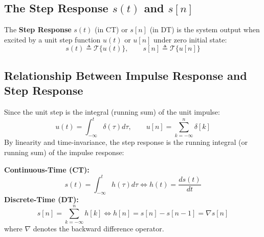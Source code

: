 \documentclass[12pt,a4paper]{article}
\begin{document}
\subsection{The Step Response $s(t)$ and $s[n]$}

\begin{tcolorbox}[defbox, title={\textbf{Definition: Step Response}}]
The \textbf{Step Response} $s(t)$ (in CT) or $s[n]$ (in DT) is the system output when excited by a unit step function $u(t)$ or $u[n]$ under zero initial state:
\begin{equation}
  s(t) \triangleq \mathcal{T}\{u(t)\}, \qquad s[n] \triangleq \mathcal{T}\{u[n]\}
\end{equation}
\end{tcolorbox}

\subsection{Relationship Between Impulse Response and Step Response}
Since the unit step is the integral (running sum) of the unit impulse:
\begin{equation}
  u(t) = \int_{-\infty}^t \delta(\tau) d\tau, \qquad u[n] = \sum_{k=-\infty}^n \delta[k]
\end{equation}
By linearity and time-invariance, the step response is the running integral (or running sum) of the impulse response:

\begin{tcolorbox}[formulabox, title={\textbf{Fundamental Inter-relationships: Impulse $\leftrightarrow$ Step Response}}]
\textbf{Continuous-Time (CT):}
\begin{equation}
  s(t) = \int_{-\infty}^{t} h(\tau) d\tau \iff h(t) = \frac{ds(t)}{dt}
\end{equation}
\textbf{Discrete-Time (DT):}
\begin{equation}
  s[n] = \sum_{k=-\infty}^{n} h[k] \iff h[n] = s[n] - s[n-1] = \nabla s[n]
\end{equation}
where $\nabla$ denotes the backward difference operator.
\end{tcolorbox}
\end{document}
